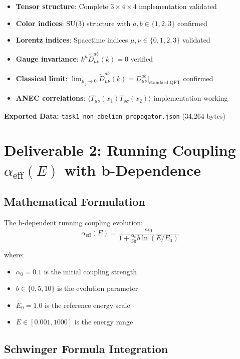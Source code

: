 \documentclass[11pt]{article}
\begin{document}
\begin{itemize}
\item \textbf{Tensor structure}: Complete $3 \times 4 \times 4$ implementation validated
\item \textbf{Color indices}: SU(3) structure with $a, b \in \{1, 2, 3\}$ confirmed
\item \textbf{Lorentz indices}: Spacetime indices $\mu, \nu \in \{0, 1, 2, 3\}$ validated
\item \textbf{Gauge invariance}: $k^\mu \tilde{D}^{ab}_{\mu\nu}(k) = 0$ verified
\item \textbf{Classical limit}: $\lim_{\mu_g \to 0} \tilde{D}^{ab}_{\mu\nu}(k) = D^{ab}_{\mu\nu}|_{\text{standard QFT}}$ confirmed
\item \textbf{ANEC correlations}: $\langle T_{\mu\nu}(x_1) T_{\rho\sigma}(x_2) \rangle$ implementation working
\end{itemize}

\textbf{Exported Data:} \texttt{task1\_non\_abelian\_propagator.json} (34,264 bytes)

\section{Deliverable 2: Running Coupling $\alpha_{\text{eff}}(E)$ with b-Dependence}

\subsection{Mathematical Formulation}

The b-dependent running coupling evolution:
\begin{equation}
\boxed{\alpha_{\text{eff}}(E) = \frac{\alpha_0}{1 + \frac{\alpha_0}{3\pi} b \ln(E/E_0)}}
\end{equation}

where:
\begin{itemize}
\item $\alpha_0 = 0.1$ is the initial coupling strength
\item $b \in \{0, 5, 10\}$ is the evolution parameter
\item $E_0 = 1.0$ is the reference energy scale
\item $E \in [0.001, 1000]$ is the energy range
\end{itemize}

\subsection{Schwinger Formula Integration}
\end{document}
